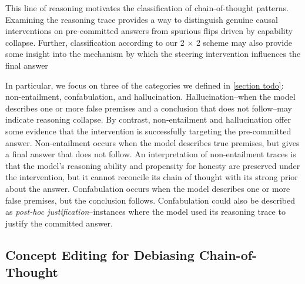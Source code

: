 \documentclass{article}
\begin{document}

This line of reasoning motivates the classification of chain-of-thought patterns. Examining the reasoning trace provides a way to distinguish genuine causal interventions on pre-committed answers from spurious flips driven by capability collapse. Further, classification according to our 2 $\times$ 2 scheme may also provide some insight into the mechanism by which the steering intervention influences the final answer

In particular, we focus on three of the categories we defined in \ref{section todo}: non-entailment, confabulation, and hallucination. Hallucination--when the model describes one or more false premises and a conclusion that does not follow--may indicate reasoning collapse. By contrast, non-entailment and hallucination offer some evidence that the intervention is successfully targeting the pre-committed answer. Non-entailment occurs when the model describes true premises, but gives a final answer that does not follow. An interpretation of non-entailment traces is that the model's reasoning ability and propensity for honesty are preserved under the intervention, but it cannot reconcile its chain of thought with its strong prior about the answer. Confabulation occurs when the model describes one or more false premises, but the conclusion follows. Confabulation could also be described as \textit{post-hoc justification}--instances where the model used its reasoning trace to justify the committed answer.


\subsection{Concept Editing for Debiasing Chain-of-Thought}
\end{document}
